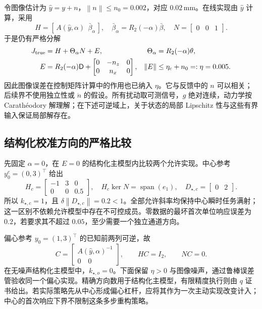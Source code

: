 \documentclass[11pt,a4paper]{article}
\numberwithin{equation}{section}
\theoremstyle{definition}
\newcommand{\norm}[1]{\left\lVert#1\right\rVert}
\begin{document}
令图像估计为 $\widehat y=y+n$，$\norm{n}\le n_0=0.002$，对应 $0.02\,\mathrm{mm}$。在线实现由 $\widehat y$ 计算，采用
\begin{equation}
 H=\left[\,A(\widehat y,\alpha)\ \ \bar\beta_\alpha\,\right],
 \quad\bar\beta_\alpha=R_2(-\alpha)\bar\beta,
 \quad N=\begin{bmatrix}0&0&1\end{bmatrix}.
 \label{rev:example-known-model}
\end{equation}
于是仍有严格分解
\begin{align}
 J_{\rm true}&=H+\Theta_\alpha N+E,
 &\Theta_\alpha&=R_2(-\alpha)\theta,\nonumber\\
 E&=R_2(-\alpha)\mathsf D+
 \begin{bmatrix}0&-n_z&0\\0&n_x&0\end{bmatrix},
 &\norm{E}&\le\eta_c+n_0=:\eta=0.005.
 \label{rev:example-error-factorization}
\end{align}
因此图像误差在控制矩阵计算中的作用也已纳入 $\eta$。它与反馈中的 $n$ 可以相关；后续界不使用独立性或 $\dot n$ 的假设。所有扰动取可测信号，$g$ 绝对连续，动力学按 Carathéodory 解理解；在下述可逆域上，关于状态的局部 Lipschitz 性与这些有界输入保证局部解存在。

\subsection{结构化校准方向的严格比较}
先固定 $\alpha=0$，在 $E=0$ 的结构化主模型内比较两个允许实现。中心参考 $y_0^c=(0,3)^\top$ 给出
\begin{equation}
 H_c=\begin{bmatrix}-1&3&0\\0&0&0.5\end{bmatrix},
 \quad H_c\ker N=\operatorname{span}(e_1),
 \quad D_{\star,c}=\begin{bmatrix}0&2\end{bmatrix}.
 \label{rev:example-centred-rank}
\end{equation}
所以 $k_{\star,c}=1$，且 $\delta\norm{D_{\star,c}}=0.2<1$。全部允许斜率均保持中心瞬时任务满射；这一区别不依赖允许模型中存在不可控成员。零数据的最坏首次单位响应误差为 $0.2$，若要求其不超过 $0.05$，至少需要一个独立通道方向。

偏心参考 $y_0=(1,3)^\top$ 的已知前两列可逆，故
\begin{equation}
 C=\begin{bmatrix}A(\widehat y,\alpha)^{-1}\\0\quad0\end{bmatrix},
 \qquad HC=I_2,
 \qquad NC=0.
 \label{rev:example-allocation}
\end{equation}
在无噪声结构化主模型中，$k_{\star,o}=0$。下面保留 $\eta>0$ 与图像噪声，通过鲁棒误差管验收同一个偏心实现。精确方向数用于结构化主模型，有限精度执行则由 $q$ 证书给出。若实际策略先从中心形成偏心杠杆，应将其作为一次主动实现改变计入；中心的首次响应下界不限制这条多步重构策略。
\end{document}

